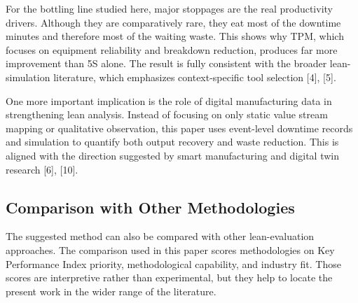 \documentclass[12pt,a4paper]{article}
\begin{document}
For the bottling line studied here, major stoppages are the real productivity drivers. Although they are comparatively rare, they eat most of the downtime minutes and therefore most of the waiting waste. This shows why TPM, which focuses on equipment reliability and breakdown reduction, produces far more improvement than 5S alone. The result is fully consistent with the broader lean-simulation literature, which emphasizes context-specific tool selection [4], [5].

One more important implication is the role of digital manufacturing data in strengthening lean analysis. Instead of focusing on only static value stream mapping or qualitative observation, this paper uses event-level downtime records and simulation to quantify both output recovery and waste reduction. This is aligned with the direction suggested by smart manufacturing and digital twin research [6], [10].

\subsection{Comparison with Other Methodologies}
The suggested method can also be compared with other lean-evaluation approaches. The comparison used in this paper scores methodologies on Key Performance Index priority, methodological capability, and industry fit. Those scores are interpretive rather than experimental, but they help to locate the present work in the wider range of the literature.
\end{document}
